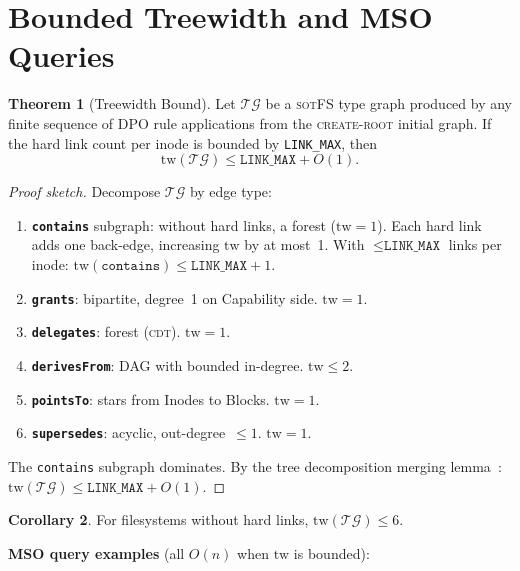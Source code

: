 \documentclass[11pt,a4paper]{article}
\theoremstyle{definition}
\newtheorem{theorem}{Theorem}[section]
\newtheorem{corollary}[theorem]{Corollary}
\newcommand{\TG}{\ensuremath{\mathcal{TG}}}
\newcommand{\sotfs}{\textsc{sotFS}}
\newcommand{\CDT}{\textsc{cdt}}
\newcommand{\tw}{\ensuremath{\mathrm{tw}}}
\begin{document}
\section{Bounded Treewidth and MSO Queries}\label{sec:treewidth}

\begin{theorem}[Treewidth Bound]\label{thm:treewidth}
Let \TG{} be a \sotfs{} type graph produced by any finite sequence of DPO
rule applications from the \textsc{create-root} initial graph. If the hard
link count per inode is bounded by \texttt{LINK\_MAX}, then
\[
  \tw(\TG) \le \texttt{LINK\_MAX} + O(1).
\]
\end{theorem}

\begin{proof}[Proof sketch]
Decompose \TG{} by edge type:
\begin{enumerate}[nosep]
  \item \textbf{\texttt{contains}} subgraph: without hard links, a forest
    ($\tw = 1$). Each hard link adds one back-edge, increasing $\tw$ by at
    most~1. With $\le \texttt{LINK\_MAX}$ links per inode:
    $\tw(\texttt{contains}) \le \texttt{LINK\_MAX} + 1$.
  \item \textbf{\texttt{grants}}: bipartite, degree~1 on Capability side.
    $\tw = 1$.
  \item \textbf{\texttt{delegates}}: forest (\CDT{}). $\tw = 1$.
  \item \textbf{\texttt{derivesFrom}}: DAG with bounded in-degree. $\tw \le 2$.
  \item \textbf{\texttt{pointsTo}}: stars from Inodes to Blocks. $\tw = 1$.
  \item \textbf{\texttt{supersedes}}: acyclic, out-degree~$\le 1$. $\tw = 1$.
\end{enumerate}
The \texttt{contains} subgraph dominates. By the tree decomposition merging
lemma~\cite{bodlaender1998}: $\tw(\TG) \le \texttt{LINK\_MAX} + O(1)$.
\end{proof}

\begin{corollary}
For filesystems without hard links, $\tw(\TG) \le 6$.
\end{corollary}

\textbf{MSO query examples} (all $O(n)$ when $\tw$ is bounded):
\end{document}
